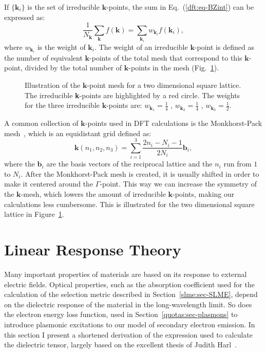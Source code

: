\begin{refsection}
If $\{\mathbf{k}_i\}$ is the set of irreducible $\mathbf{k}$-points, the sum 
in Eq.~(\ref{dft:eq-BZint}) can be expressed as: 
\begin{equation} 
\frac{1}{N_\mathbf{k}} \sum_\mathbf{k} f(\mathbf{k}) =  \sum_{\mathbf{k}_i} 
w_{\mathbf{k}_i} f(\mathbf{k}_i), 
\end{equation} 
where $w_{\mathbf{k}_i}$ is the weight of $\mathbf{k}_i$. The weight of an 
irreducible $\mathbf{k}$-point is defined as the number of equivalent 
$\mathbf{k}$-points of the total mesh that correspond to this 
$\mathbf{k}$-point, divided by the total number of $\mathbf{k}$-points in the 
mesh (Fig.~\ref{dft:fig-k_mesh}). 
 
\begin{figure}[ht]  
\centering 

\caption{\label{dft:fig-k_mesh}Illustration of the $\mathbf{k}$-point mesh for a 
two dimensional square lattice. The irreducible \textbf{k}-points are 
highlighted by a red circle. The weights for the three irreducible 
$\mathbf{k}$-points are: $w_{\mathbf{k}_1} = \frac{1}{4}$ , $w_{\mathbf{k}_2} 
= \frac{1}{4}$ , $w_{\mathbf{k}_3} = \frac{1}{2}$.} 
\end{figure} 

 \label{dft:sec-monkhorst}
A common collection of $\mathbf{k}$-points used in \gls{DFT} calculations is the 
Monkhorst-Pack mesh~\cite{Monkhorst1976}, which is an equidistant grid defined 
as: 
\begin{equation} 
\mathbf{k}(n_1,n_2,n_3) = \sum_{i=1}^{3} \frac{2n_i - N_i - 1}{2N_i} 
\mathbf{b}_i, 
\end{equation} 
where the $\mathbf{b}_i$ are the basis vectors of the reciprocal lattice and the $n_i$ run 
from $1$ to $N_i$. After the Monkhorst-Pack mesh is created, it is usually 
shifted in order to make it centered around the $\Gamma$-point. This way we 
can increase the symmetry of the $\mathbf{k}$-mesh, which lowers the amount of 
irreducible $\mathbf{k}$-points, making our calculations less cumbersome. This 
is illustrated for the two dimensional square lattice in 
Figure~\ref{dft:fig-k_mesh}. 
 
\section{Linear Response Theory} \label{dft:sec-linear} 

Many important properties of materials are based on its response to external 
electric fields. Optical properties, such as the absorption coefficient used 
for the calculation of the selection metric described in 
Section~\ref{slme:sec-SLME}, depend on the dielectric response of the material 
in the long-wavelength limit. So does the electron energy loss function, used in 
Section~\ref{quotas:sec-plasmons} to introduce plasmonic excitations to our 
model of secondary electron emission. In this section I present a shortened 
derivation of the expression used to calculate the dielectric tensor, largely 
based on the excellent thesis of Judith Harl~\cite{Harl2008}.


\end{refsection}
